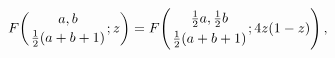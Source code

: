 \[\mathop{F\/}\nolimits\!\left({a,b\atop\frac{1}{2}(a+b+1)};z\right)=\mathop{F\/%
}\nolimits\!\left({\frac{1}{2}a,\frac{1}{2}b\atop\frac{1}{2}(a+b+1)};4z(1-z)%
\right),\]